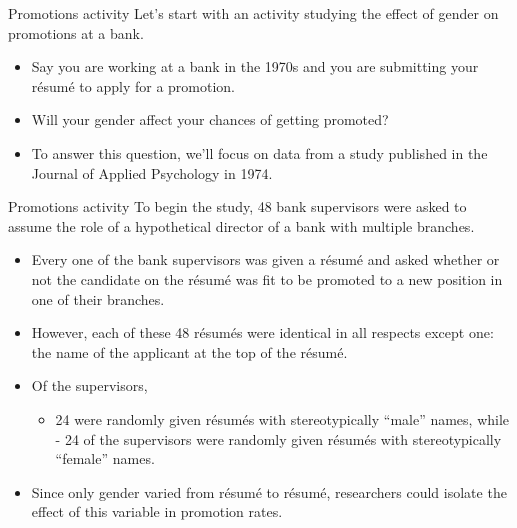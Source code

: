 \documentclass[
  ignorenonframetext,
]{beamer}
\providecommand{\tightlist}{%
  \setlength{\itemsep}{0pt}\setlength{\parskip}{0pt}}
\begin{document}
\begin{frame}{Promotions activity}
\protect\hypertarget{promotions-activity}{}
Let's start with an activity studying the effect of gender on promotions
at a bank.

\begin{itemize}
\item
  Say you are working at a bank in the 1970s and you are submitting your
  résumé to apply for a promotion.
\item
  Will your gender affect your chances of getting promoted?
\item
  To answer this question, we'll focus on data from a study published in
  the Journal of Applied Psychology in 1974.
\end{itemize}
\end{frame}

\begin{frame}{Promotions activity}
\protect\hypertarget{promotions-activity-1}{}
To begin the study, 48 bank supervisors were asked to assume the role of
a hypothetical director of a bank with multiple branches.

\begin{itemize}
\item
  Every one of the bank supervisors was given a résumé and asked whether
  or not the candidate on the résumé was fit to be promoted to a new
  position in one of their branches.
\item
  However, each of these 48 résumés were identical in all respects
  except one: the name of the applicant at the top of the résumé.
\item
  Of the supervisors,

  \begin{itemize}
  \tightlist
  \item
    24 were randomly given résumés with stereotypically ``male'' names,
    while - 24 of the supervisors were randomly given résumés with
    stereotypically ``female'' names.
  \end{itemize}
\item
  Since only gender varied from résumé to résumé, researchers could
  isolate the effect of this variable in promotion rates.
\end{itemize}
\end{frame}
\end{document}
